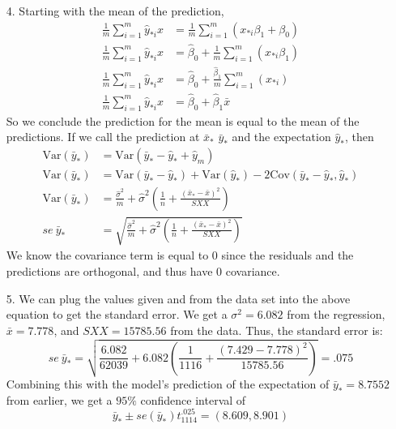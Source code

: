 \documentclass[11pt]{article}
\newcommand{\var}{\mathrm{Var}}
\newcommand{\cov}{\mathrm{Cov}}
\theoremstyle{definition}
\begin{document}
\begin{itemize}
\begin{itemize}
\begin{itemize}
                    \item[4.]
                        Starting with the mean of the prediction, 
                        \begin{align*}
                            \frac{1}{m} \sum_{i=1}^m \hat y_{*i} x &= \frac{1}{m} \sum_{i=1}^m (x_{*i}\beta_1 + \beta_0) \\ 
                            \frac{1}{m} \sum_{i=1}^m \hat y_{*i} x &= \hat\beta_0 + \frac{1}{m} \sum_{i=1}^m (x_{*i}\beta_1) \\ 
                            \frac{1}{m} \sum_{i=1}^m \hat y_{*i} x &= \hat\beta_0 + \frac{\hat\beta_1}{m} \sum_{i=1}^m (x_{*i})  \\ 
                            \frac{1}{m} \sum_{i=1}^m \hat y_{*i} x &= \hat\beta_0 + \hat\beta_1 \bar x  
                        \end{align*}
                        So we conclude the prediction for the mean is equal to the mean of the predictions. If we call the prediction at $\bar x_*$ $\bar y_*$ and the expectation $\hat y_*$, then
                        \begin{align*}
                            \var(\bar y_*) &= \var(\bar y_* - \hat y_* + \hat y_m ) \\  
                            \var(\bar y_*) &= \var(\bar y_* - \hat y_*) + \var(\hat y_*) -2\cov(\bar y_* - \hat y_*,\hat y_*) \\  
                            \var(\bar y_*) &= \frac{\hat\sigma^2}{m} + \hat\sigma^2\left(\frac{1}{n} + \frac{(\bar x_* - \bar x)^2}{SXX} \right) \\  
                            se \>\bar y_* &= \sqrt{\frac{\hat\sigma^2}{m} + \hat\sigma^2\left(\frac{1}{n} + \frac{(\bar x_* - \bar x)^2}{SXX} \right)}   
                        \end{align*}
                        We know the covariance term is equal to $0$ since the residuals and the predictions are orthogonal, and thus have $0$ covariance.
                    \item[5.]
                        We can plug the values given and from the data set into the above equation to get the standard error. We get a $\sigma^2=6.082$ from the regression, $\bar x=7.778$, and $SXX= 15785.56$ from the data. Thus, the standard error is:
                        \[ se \>\bar y_* = \sqrt{\frac{6.082}{62039} + 6.082\left(\frac{1}{1116} + \frac{(7.429 - 7.778)^2}{15785.56} \right)} = .075 \]   
                        Combining this with the model's prediction of the expectation of $\bar y_*=8.7552$ from earlier, we get a $95\%$ confidence interval of 
                        \[\bar y_* \pm se(\bar y_*) t_{1114}^{.025} = (8.609,8.901) \]
                \end{itemize}


\end{itemize}
\end{itemize}
\end{document}
